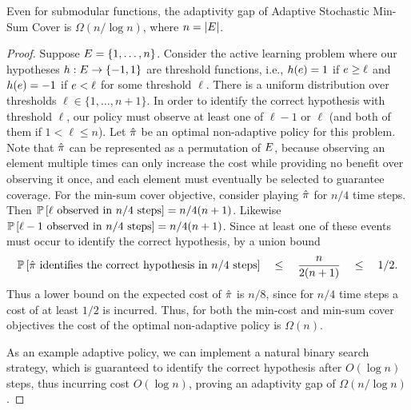 {\begin{theorem}
Even for \term submodular functions, the adaptivity gap of
Adaptive Stochastic Min-Sum Cover 
is $\Omega(n/\log n)$, where $n=|E|$. 
\end{theorem}
\begin{proof}
Suppose $E = \{1,\dots,n\}$. Consider the active learning
problem where our hypotheses $h:E\rightarrow\left\{-1,1\right\}$ are
threshold functions, i.e., $h(e)=1$ if $e\geq \ell$ and
$h(e)=-1$ if $e<\ell$ for some threshold $\ell$. There is a
uniform distribution over thresholds $\ell\in\{1,\dots,n+1\}$. In
order to identify the correct hypothesis with threshold $\ell$, our
policy must observe at least one of  $\ell-1$ or $\ell$ (and both
of them if $1<\ell\leq n$).  
Let $\hat{\pi}$ be an optimal non-adaptive
policy for this problem.
Note that $\hat{\pi}$ can be represented as a permutation of
$E$, because
observing an element multiple times can only increase the cost
while providing no benefit over observing it once,
and each element must eventually be selected to guarantee coverage. 
For the min-sum cover objective, consider playing $\hat{\pi}$ for
$n/4$ time steps. Then $\mathbb{P}\left[\ell \text{ observed in } n/4 \text{
    steps}\right]  =n/4(n+1)$.  Likewise 
$\mathbb{P}\left[\ell-1 \text{ observed in } n/4 \text{
    steps}\right]  =n/4(n+1)$.
Since at least one of these events must occur to identify the correct
hypothesis, by a union bound 
$$ \mathbb{P}\left[\hat{\pi} \text{ identifies the correct hypothesis in } n/4 \text{
    steps}\right]  \quad  \le \quad \frac{n}{2(n+1)} \quad \le \quad  1/2.$$
Thus a lower bound on the expected cost of $\hat{\pi}$ is $n/8$, since for $n/4$ time
steps a cost of at least $1/2$ is incurred. Thus, for both the min-cost and min-sum cover objectives the cost of the optimal non-adaptive policy is $\Omega(n)$.

As an example adaptive policy, we can implement a natural binary
search strategy, which is guaranteed to identify the correct
hypothesis after $O(\log n)$  steps, thus incurring cost $O(\log n)$, 
proving an adaptivity gap of $\Omega(n/\log n)$.
\end{proof}

} %


%
%
%
%
%
